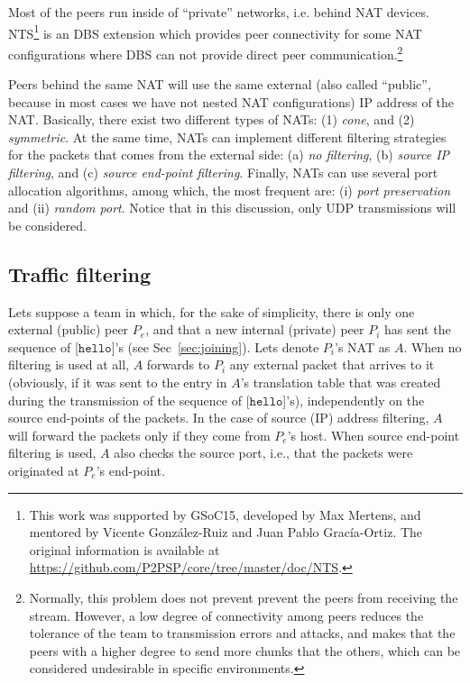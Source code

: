 
\label{sec:NTS}

Most of the peers run inside of ``private'' networks, i.e. behind NAT
devices. NTS\footnote{This work was supported by GSoC15, developed by
Max Mertens, and mentored by Vicente González-Ruiz and Juan Pablo
Gracía-Ortiz. The original information is available
at \url{https://github.com/P2PSP/core/tree/master/doc/NTS}.} is an DBS
extension which provides peer connectivity for some NAT configurations
where DBS can not provide direct peer
communication.\footnote{Normally, this problem does not prevent
prevent the peers from receiving the stream. However, a low degree of
connectivity among peers reduces the tolerance of the team to
transmission errors and attacks, and makes that the peers with a
higher degree to send more chunks that the others, which can be
considered undesirable in specific environments.}

Peers behind the same NAT will use the same external (also called
``public'', because in most cases we have not nested NAT
configurations) IP address of the NAT. Basically, there exist two
different types of NATs: (1) \emph{cone}, and (2) \emph{symmetric}. At
the same time, NATs can implement different filtering strategies for
the packets that comes from the external side: (a) \emph{no
  filtering}, (b) \emph{source IP filtering}, and (c) \emph{source
  end-point filtering}. Finally, NATs can use several port allocation
algorithms, among which, the most frequent are: (i) \emph{port
  preservation} and (ii) \emph{random port}. Notice that in this
discussion, only UDP transmissions will be considered.

\subsection{Traffic filtering}
Lets suppose a team in which, for the sake of simplicity, there is
only one external (public) peer $P_e$, and that a new internal
(private) peer $P_i$ has sent the sequence of [$\mathtt{hello}$]'s
(see Sec~\ref{sec:joining}). Lets denote $P_i$'s NAT as $A$. When no
filtering is used at all, $A$ forwards to $P_i$ any external packet
that arrives to it (obviously, if it was sent to the entry in $A$'s
translation table that was created during the transmission of the
sequence of [$\mathtt{hello}$]'s), independently on the source
end-points of the packets. In the case of source (IP) address
filtering, $A$ will forward the packets only if they come from
$P_e$'s host.  When source end-point filtering is used, $A$ also
checks the source port, i.e., that the packets were originated at
$P_e$'s end-point.

